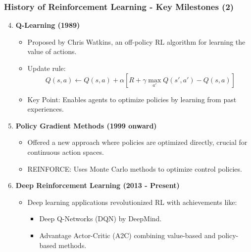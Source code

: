 \documentclass{beamer}
\begin{document}
\begin{frame}[fragile]
    \frametitle{History of Reinforcement Learning - Key Milestones (2)}
    \begin{enumerate}
        \setcounter{enumi}{3} %
        \item \textbf{Q-Learning (1989)}
        \begin{itemize}
            \item Proposed by Chris Watkins, an off-policy RL algorithm for learning the value of actions.
            \item Update rule:
            \begin{equation}
                Q(s, a) \leftarrow Q(s, a) + \alpha\left[R + \gamma \max_{a'} Q(s', a') - Q(s, a)\right]
            \end{equation}
            \item Key Point: Enables agents to optimize policies by learning from past experiences.
        \end{itemize}
        
        \item \textbf{Policy Gradient Methods (1999 onward)}
        \begin{itemize}
            \item Offered a new approach where policies are optimized directly, crucial for continuous action spaces.
            \item REINFORCE: Uses Monte Carlo methods to optimize control policies.
        \end{itemize}
        
        \item \textbf{Deep Reinforcement Learning (2013 - Present)}
        \begin{itemize}
            \item Deep learning applications revolutionized RL with achievements like:
            \begin{itemize}
                \item Deep Q-Networks (DQN) by DeepMind.
                \item Advantage Actor-Critic (A2C) combining value-based and policy-based methods.
            \end{itemize}
        \end{itemize}
    \end{enumerate}
\end{frame}
\end{document}
